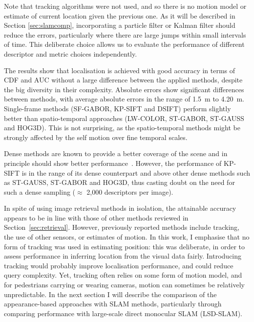 Note that tracking algorithms were not used, and so there is no motion model or estimate of current location given the previous one. As it will be described in Section \ref{sec:slamcomp}, incorporating a particle filter or Kalman filter should reduce the errors, particularly where there are large jumps within small intervals of time. This deliberate choice allows us to evaluate the performance of different descriptor and metric choices independently.

The results show that localisation is achieved with good accuracy in terms of CDF and AUC without a large difference between the applied methods, despite the big diversity in their complexity. Absolute errors show significant differences between methods, with average absolute errors in the range of \SI{1.5}{m} to \SI{4.20}{m}. Single-frame methods (SF-GABOR, KP-SIFT and DSIFT) perform slightly better than spatio-temporal approaches (LW-COLOR, ST-GABOR, ST-GAUSS and HOG3D). This is not surprising, as the spatio-temporal methods might be strongly affected by the self motion over fine temporal scales.

Dense methods are known to provide a better coverage of the scene and in principle should show better performance~\cite{tuytelaars2010dense}. However, the performance of KP-SIFT is in the range of its dense counterpart and above other dense methods such as ST-GAUSS, ST-GABOR and HOG3D, thus casting doubt on the need for such a dense sampling ($\approx$ 2,000 descriptors per image).

In spite of using image retrieval methods in isolation, the attainable accuracy appears to be in line with those of  other methods reviewed in Section~\ref{sec:retrieval}.  However, previously reported methods include tracking, the use of other sensors, or estimates of motion. In this work, I emphasise that no form of tracking was used in estimating position: this was deliberate, in order to assess performance in inferring location from the visual data fairly.  Introducing tracking would probably improve localisation performance, and could reduce query complexity. Yet, tracking often relies on some form of motion model, and for pedestrians carrying or wearing cameras, motion can sometimes be relatively unpredictable. In the next section I will describe the comparison of the appearance-based approaches with SLAM methods, particularly through comparing performance with large-scale direct monocular SLAM (LSD-SLAM).

